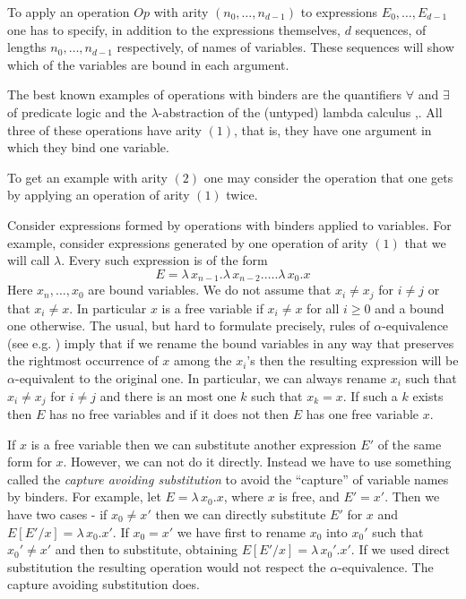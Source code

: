 \documentclass[12pt]{amsart}
\begin{document}
To apply an operation $Op$ with arity $(n_0,\dots,n_{d-1})$ to expressions $E_0,\dots,E_{d-1}$ one has to specify, in addition to the expressions themselves, $d$ sequences, of lengths $n_0,\dots,n_{d-1}$ respectively, of names of variables. These sequences will show which of the variables are bound in each argument. 

The best known examples of operations with binders are the quantifiers $\forall$ and $\exists$ of predicate logic and the $\lambda$-abstraction of the (untyped) lambda calculus \cite{Church1932},\cite{Barendregt}. All three of these operations have arity $(1)$, that is, they have one argument in which they bind one variable. 

To get an example with arity $(2)$ one may consider the operation that one gets by applying an operation of arity $(1)$ twice.

Consider expressions formed by operations with binders applied to variables. For example, consider expressions generated by one operation of arity $(1)$ that we will call $\lambda$. Every such expression is of the form
%
$$E=\lambda\,x_{n-1}.\lambda\,x_{n-2}.\dots.\lambda\,x_0.x$$
%
Here $x_n,\dots,x_{0}$ are bound variables. We do not assume that $x_i\ne x_j$ for $i\ne j$ or that $x_i\ne x$. In particular $x$ is a free variable if $x_i\ne x$ for all $i\ge 0$ and a bound one otherwise. The usual, but hard to formulate precisely, rules of $\alpha$-equivalence (see e.g. \cite[Def. 2.1.11, p.26]{Barendregt}) imply that if we rename the bound variables in any way that preserves the rightmost occurrence of $x$ among the $x_i$'s then the resulting expression will be $\alpha$-equivalent to the original one. In particular, we can always rename $x_i$ such that $x_i\ne x_j$ for $i\ne j$ and there is an most one  
$k$ such that $x_k=x$. If such a $k$ exists then $E$ has no free variables and if it does not then $E$ has one free variable $x$. 

If $x$ is a free variable then we can substitute another expression $E'$ of the same form for $x$. However, we can not do it directly. Instead we have to use something called the {\em capture avoiding substitution} to avoid the ``capture'' of variable names by binders. For example, let $E=\lambda\,x_0.x$, where $x$ is free, and $E'=x'$. Then we have two cases - if $x_0\ne x'$ then we can directly substitute $E'$ for $x$ and $E[E'/x]=\lambda\,x_0.x'$. If $x_0=x'$ we have first to rename $x_0$ into $x_0'$ such that $x_0'\ne x'$ and then to substitute, obtaining $E[E'/x]=\lambda\,x_0'.x'$. If we used direct substitution the resulting operation would not respect the $\alpha$-equivalence. The capture avoiding substitution does. 
\end{document}
